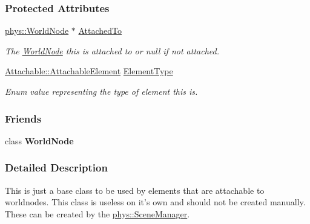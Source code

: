 \subsubsection*{Protected Attributes}
\begin{DoxyCompactItemize}
\item 
\hypertarget{classphys_1_1Attachable_ac781addd4313b292b7f6bf87015286fd}{
\hyperlink{classphys_1_1WorldNode}{phys::WorldNode} $\ast$ \hyperlink{classphys_1_1Attachable_ac781addd4313b292b7f6bf87015286fd}{AttachedTo}}
\label{classphys_1_1Attachable_ac781addd4313b292b7f6bf87015286fd}

\begin{DoxyCompactList}\small\item\em The \hyperlink{classphys_1_1WorldNode}{WorldNode} this is attached to or null if not attached. \item\end{DoxyCompactList}\item 
\hyperlink{classphys_1_1Attachable_acd1fca033e7cc0bb3024a92d466d213a}{Attachable::AttachableElement} \hyperlink{classphys_1_1Attachable_af574d5f08a304c6e0ae002bb2fc057c7}{ElementType}
\begin{DoxyCompactList}\small\item\em Enum value representing the type of element this is. \item\end{DoxyCompactList}\end{DoxyCompactItemize}
\subsubsection*{Friends}
\begin{DoxyCompactItemize}
\item 
\hypertarget{classphys_1_1Attachable_a1cacd07efb11226da49a7c80569b18e8}{
class {\bfseries WorldNode}}
\label{classphys_1_1Attachable_a1cacd07efb11226da49a7c80569b18e8}

\end{DoxyCompactItemize}


\subsubsection{Detailed Description}
This is just a base class to be used by elements that are attachable to worldnodes. This class is useless on it's own and should not be created manually. These can be created by the \hyperlink{classphys_1_1SceneManager}{phys::SceneManager}. 

